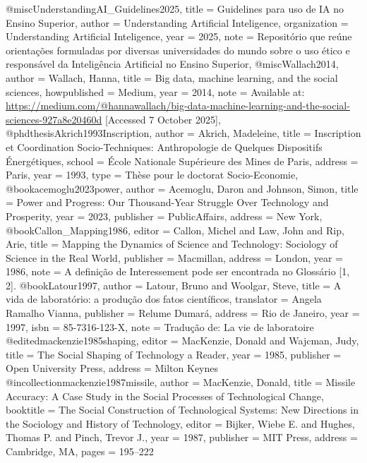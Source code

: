 @misc{UnderstandingAI_Guidelines2025,
  title        = {{Guidelines para uso de IA no Ensino Superior}},
  author       = {{Understanding Artificial Inteligence}},
  organization = {Understanding Artificial Inteligence},
  year         = {2025},
  note         = {Repositório que reúne orientações formuladas por diversas universidades do mundo sobre o uso ético e responsável da Inteligência Artificial no Ensino Superior},
}
@misc{Wallach2014,
  author       = {Wallach, Hanna},
  title        = {{Big data, machine learning, and the social sciences}},
  howpublished = {Medium},
  year         = {2014},
  note         = {Available at: \url{https://medium.com/@hannawallach/big-data-machine-learning-and-the-social-sciences-927a8e20460d} [Accessed 7 October 2025]},
}
@phdthesis{Akrich1993Inscription,
  author    = {Akrich, Madeleine},
  title     = {{Inscription et Coordination Socio-Techniques: Anthropologie de Quelques Dispositifs Énergétiques}},
  school    = {École Nationale Supérieure des Mines de Paris},
  address   = {Paris},
  year      = {1993},
  type      = {Thèse pour le doctorat Socio-Economie},
}
@book{acemoglu2023power,
  author    = {Acemoglu, Daron and Johnson, Simon},
  title     = {Power and Progress: Our Thousand-Year Struggle Over Technology and Prosperity},
  year      = {2023},
  publisher = {PublicAffairs},
  address   = {New York},
}
@book{Callon_Mapping1986,
  editor    = {Callon, Michel and Law, John and Rip, Arie},
  title     = {Mapping the Dynamics of Science and Technology: Sociology of Science in the Real World},
  publisher = {Macmillan},
  address   = {London},
  year      = {1986},
  note      = {A definição de Interessement pode ser encontrada no Glossário [1, 2].}
}
@book{Latour1997,
  author = {Latour, Bruno and Woolgar, Steve},
  title = {A vida de laboratório: a produção dos fatos científicos},
  translator = {Angela Ramalho Vianna},
  publisher = {Relume Dumará},
  address = {Rio de Janeiro},
  year = {1997},
  isbn = {85-7316-123-X},
  note = {Tradução de: La vie de laboratoire}
}
@edited{mackenzie1985shaping,
  editor = {MacKenzie, Donald and Wajcman, Judy},
  title = {The Social Shaping of Technology a Reader},
  year = {1985},
  publisher = {Open University Press},
  address = {Milton Keynes}
}
@incollection{mackenzie1987missile,
  author = {MacKenzie, Donald},
  title = {Missile Accuracy: A Case Study in the Social Processes of Technological Change},
  booktitle = {The Social Construction of Technological Systems: New Directions in the Sociology and History of Technology},
  editor = {Bijker, Wiebe E. and Hughes, Thomas P. and Pinch, Trevor J.},
  year = {1987},
  publisher = {MIT Press},
  address = {Cambridge, MA},
  pages = {195--222}
}
